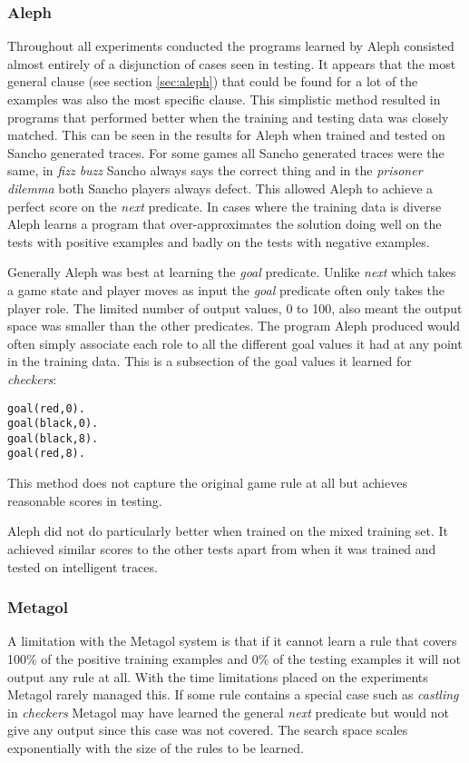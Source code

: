 \subsubsection{Aleph}
Throughout all experiments conducted the programs learned by Aleph consisted almost entirely of a disjunction of cases seen in testing. It appears that the most general clause (see section \ref{sec:aleph}) that could be found for a lot of the examples was also the most specific clause. This simplistic method resulted in programs that performed better when the training and testing data was closely matched. This can be seen in the results for Aleph when trained and tested on Sancho generated traces. For some games all Sancho generated traces were the same, in \textit{fizz buzz} Sancho always says the correct thing and in the \textit{prisoner dilemma} both Sancho players always defect. This allowed Aleph to achieve a perfect score on the \textit{next} predicate. In cases where the training data is diverse Aleph learns a program that over-approximates the solution doing well on the tests with positive examples and badly on the tests with negative examples.

Generally Aleph was best at learning the \textit{goal} predicate. Unlike \textit{next} which takes a game state and player moves as input the \textit{goal} predicate often only takes the player role. The limited number of output values, 0 to 100, also meant the output space was smaller than the other predicates. The program Aleph produced would often simply associate each role to all the different goal values it had at any point in the training data. This is a subsection of the goal values it learned for \textit{checkers}:
\begin{verbatim}
goal(red,0).
goal(black,0).
goal(black,8).
goal(red,8).
\end{verbatim}
This method does not capture the original game rule at all but achieves reasonable scores in testing.

Aleph did not do particularly better when trained on the mixed training set. It achieved similar scores to the other tests apart from when it was trained and tested on intelligent traces.

\subsubsection{Metagol}
A limitation with the Metagol system is that if it cannot learn a rule that covers 100\% of the positive training examples and 0\% of the testing examples it will not output any rule at all. With the time limitations placed on the experiments Metagol rarely managed this. If some rule contains a special case such as \textit{castling} in \textit{checkers} Metagol may have learned the general \textit{next} predicate but would not give any output since this case was not covered. The search space scales exponentially with the size of the rules to be learned.

